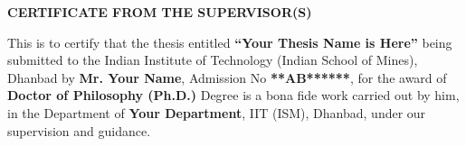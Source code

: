 \newpage

\setlength{\headheight}{5cm} %
\renewcommand{\headrulewidth}{0pt} %


\fancyhead[L]{} %
\fancyhead[C]{} %




\vspace{2cm} %

\begin{center}
    {\textbf{\color{red}\large CERTIFICATE FROM THE SUPERVISOR(S)}}
\end{center}

\vspace{0.5cm}
\setlength{\parskip}{1em} %



\noindent
This is to certify that the thesis entitled \textbf{“Your Thesis Name is Here”} being submitted to the Indian Institute of Technology (Indian School of Mines), Dhanbad by \textbf{Mr. Your Name}, Admission No \textbf{**AB******}, for the award of \textbf{Doctor of Philosophy (Ph.D.)} Degree is a bona fide work carried out by him, in the Department of \textbf{Your Department}, IIT (ISM), Dhanbad, under our supervision and guidance.


